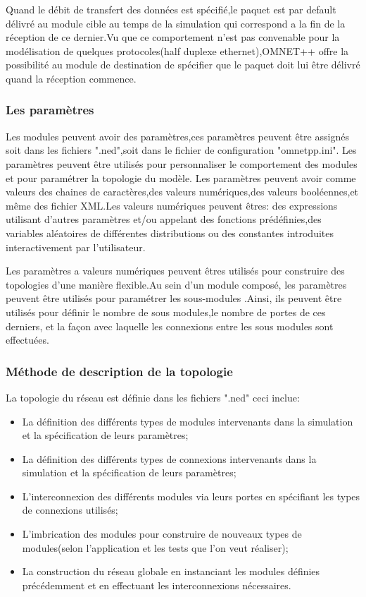 Quand le débit de transfert des données est spécifié,le paquet est par default délivré au module cible au temps de la simulation qui correspond a la fin de la réception de ce dernier.Vu que ce comportement n'est pas convenable pour la modélisation de quelques protocoles(half duplexe ethernet),OMNET++ offre la possibilité au module de destination de spécifier que le paquet doit lui être délivré quand la réception commence.
\subsubsection{Les paramètres}
Les modules peuvent avoir des paramètres,ces paramètres peuvent être assignés  soit dans les fichiers ".ned",soit dans le fichier de configuration  "omnetpp.ini".
Les paramètres peuvent être utilisés pour personnaliser le comportement des modules  et pour paramétrer la topologie du modèle.
Les paramètres peuvent avoir comme valeurs des chaines de caractères,des valeurs numériques,des valeurs booléennes,et même des fichier XML.Les valeurs numériques  peuvent êtres: des expressions utilisant d'autres paramètres et/ou appelant des fonctions prédéfinies,des variables aléatoires de différentes distributions  ou des constantes introduites interactivement par l'utilisateur.

Les paramètres a valeurs  numériques peuvent êtres utilisés pour construire des topologies d'une manière flexible.Au sein d'un module composé, les paramètres peuvent être utilisés pour paramétrer les sous-modules .Ainsi, ils peuvent être utilisés pour définir le nombre de sous modules,le nombre de portes de ces derniers, et la façon avec laquelle les connexions entre les sous modules sont effectuées.

\subsubsection{Méthode de description de la topologie}
La topologie du réseau est définie dans les fichiers ".ned" ceci inclue:
\begin{itemize}
\item La définition des différents types de modules intervenants dans la simulation et la spécification de leurs paramètres;
\item La définition des différents types de connexions intervenants dans la simulation et la spécification de leurs paramètres;
\item L'interconnexion des différents modules via leurs portes en spécifiant les types de connexions utilisés;
\item L'imbrication des modules pour construire de nouveaux types de modules(selon l'application et les tests que l'on veut réaliser);
\item La construction du réseau globale en instanciant les modules définies précédemment et en effectuant les interconnexions nécessaires.  
\end{itemize}

